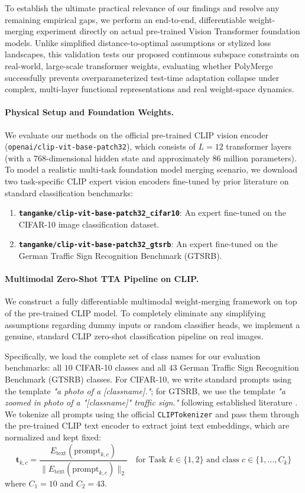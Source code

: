 To establish the ultimate practical relevance of our findings and resolve any remaining empirical gaps, we perform an end-to-end, differentiable weight-merging experiment directly on actual pre-trained Vision Transformer foundation models. Unlike simplified distance-to-optimal assumptions or stylized loss landscapes, this validation tests our proposed continuous subspace constraints on real-world, large-scale transformer weights, evaluating whether PolyMerge successfully prevents overparameterized test-time adaptation collapse under complex, multi-layer functional representations and real weight-space dynamics.

\paragraph{Physical Setup and Foundation Weights.} We evaluate our methods on the official pre-trained CLIP vision encoder (\texttt{openai/clip-vit-base-patch32}), which consists of $L=12$ transformer layers (with a 768-dimensional hidden state and approximately $86$ million parameters). To model a realistic multi-task foundation model merging scenario, we download two task-specific CLIP expert vision encoders fine-tuned by prior literature on standard classification benchmarks:
\begin{enumerate}
    \item \textbf{\texttt{tanganke/clip-vit-base-patch32\_cifar10}}: An expert fine-tuned on the CIFAR-10 image classification dataset.
    \item \textbf{\texttt{tanganke/clip-vit-base-patch32\_gtsrb}}: An expert fine-tuned on the German Traffic Sign Recognition Benchmark (GTSRB).
\end{enumerate}

\paragraph{Multimodal Zero-Shot TTA Pipeline on CLIP.} We construct a fully differentiable multimodal weight-merging framework on top of the pre-trained CLIP model. To completely eliminate any simplifying assumptions regarding dummy inputs or random classifier heads, we implement a genuine, standard CLIP zero-shot classification pipeline on real images.

Specifically, we load the complete set of class names for our evaluation benchmarks: all $10$ CIFAR-10 classes and all $43$ German Traffic Sign Recognition Benchmark (GTSRB) classes. For CIFAR-10, we write standard prompts using the template \emph{"a photo of a [classname]."}; for GTSRB, we use the template \emph{"a zoomed in photo of a "[classname]" traffic sign."} following established literature \citep{adamerging}. We tokenize all prompts using the official \texttt{CLIPTokenizer} and pass them through the pre-trained CLIP text encoder to extract joint text embeddings, which are normalized and kept fixed:
\begin{equation}
\boldsymbol{t}_{k, c} = \frac{E_{\text{text}}(\text{prompt}_{k, c})}{\|E_{\text{text}}(\text{prompt}_{k, c})\|_2} \quad \text{for Task } k \in \{1, 2\} \text{ and class } c \in \{1, \dots, C_k\}
\end{equation}
where $C_1 = 10$ and $C_2 = 43$.


